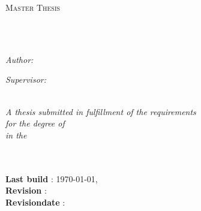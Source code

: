
\begin{titlepage}
\begin{center}

{\scshape\LARGE \univname\par}\vspace{1.5cm} %
\textsc{\Large Master Thesis}\\[0.5cm] %

\HRule \\[0.4cm] %
{\huge \bfseries \ttitle\par}\vspace{0.4cm} %
\HRule \\[1.5cm] %
 
\begin{minipage}[t]{0.4\textwidth}
\begin{flushleft} \large
\emph{Author:}\\
\authorname
\end{flushleft}
\end{minipage}
\begin{minipage}[t]{0.4\textwidth}
\begin{flushright} \large
\emph{Supervisor:} \\
\supname  
\end{flushright}
\end{minipage}\\[3cm]
 
\large \textit{A thesis submitted in fulfillment of the requirements\\ for the degree of \degreename}\\[0.3cm] %
\textit{in the}\\[0.4cm]
\univname\\\deptname\\[2cm] %

	
	\renewcommand{\dateseparator}{-}
	\begin{flushleft}
	{\textbf{Last build} : \large \today, \currenttime}\\[0cm] %
	{\textbf{Revision} : \revision}\\[0cm] %
	{\textbf{Revisiondate} : \revisiondate}\\[4cm] %
	\end{flushleft}

 
\vfill
\end{center}
\end{titlepage}